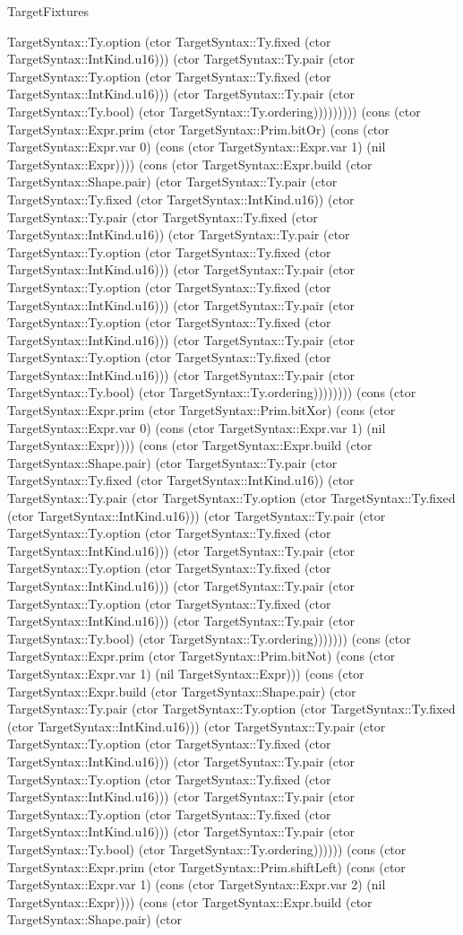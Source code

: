 \begin{lexlean}{TargetFixtures}
\begin{semanticmodule}
{TargetSyntax::Ty.option (ctor TargetSyntax::Ty.fixed (ctor TargetSyntax::IntKind.u16))) (ctor TargetSyntax::Ty.pair (ctor TargetSyntax::Ty.option (ctor TargetSyntax::Ty.fixed (ctor TargetSyntax::IntKind.u16))) (ctor TargetSyntax::Ty.pair (ctor TargetSyntax::Ty.bool) (ctor TargetSyntax::Ty.ordering))))))))) (cons (ctor TargetSyntax::Expr.prim (ctor TargetSyntax::Prim.bitOr) (cons (ctor TargetSyntax::Expr.var 0) (cons (ctor TargetSyntax::Expr.var 1) (nil TargetSyntax::Expr)))) (cons (ctor TargetSyntax::Expr.build (ctor TargetSyntax::Shape.pair) (ctor TargetSyntax::Ty.pair (ctor TargetSyntax::Ty.fixed (ctor TargetSyntax::IntKind.u16)) (ctor TargetSyntax::Ty.pair (ctor TargetSyntax::Ty.fixed (ctor TargetSyntax::IntKind.u16)) (ctor TargetSyntax::Ty.pair (ctor TargetSyntax::Ty.option (ctor TargetSyntax::Ty.fixed (ctor TargetSyntax::IntKind.u16))) (ctor TargetSyntax::Ty.pair (ctor TargetSyntax::Ty.option (ctor TargetSyntax::Ty.fixed (ctor TargetSyntax::IntKind.u16))) (ctor TargetSyntax::Ty.pair (ctor TargetSyntax::Ty.option (ctor TargetSyntax::Ty.fixed (ctor TargetSyntax::IntKind.u16))) (ctor TargetSyntax::Ty.pair (ctor TargetSyntax::Ty.option (ctor TargetSyntax::Ty.fixed (ctor TargetSyntax::IntKind.u16))) (ctor TargetSyntax::Ty.pair (ctor TargetSyntax::Ty.bool) (ctor TargetSyntax::Ty.ordering)))))))) (cons (ctor TargetSyntax::Expr.prim (ctor TargetSyntax::Prim.bitXor) (cons (ctor TargetSyntax::Expr.var 0) (cons (ctor TargetSyntax::Expr.var 1) (nil TargetSyntax::Expr)))) (cons (ctor TargetSyntax::Expr.build (ctor TargetSyntax::Shape.pair) (ctor TargetSyntax::Ty.pair (ctor TargetSyntax::Ty.fixed (ctor TargetSyntax::IntKind.u16)) (ctor TargetSyntax::Ty.pair (ctor TargetSyntax::Ty.option (ctor TargetSyntax::Ty.fixed (ctor TargetSyntax::IntKind.u16))) (ctor TargetSyntax::Ty.pair (ctor TargetSyntax::Ty.option (ctor TargetSyntax::Ty.fixed (ctor TargetSyntax::IntKind.u16))) (ctor TargetSyntax::Ty.pair (ctor TargetSyntax::Ty.option (ctor TargetSyntax::Ty.fixed (ctor TargetSyntax::IntKind.u16))) (ctor TargetSyntax::Ty.pair (ctor TargetSyntax::Ty.option (ctor TargetSyntax::Ty.fixed (ctor TargetSyntax::IntKind.u16))) (ctor TargetSyntax::Ty.pair (ctor TargetSyntax::Ty.bool) (ctor TargetSyntax::Ty.ordering))))))) (cons (ctor TargetSyntax::Expr.prim (ctor TargetSyntax::Prim.bitNot) (cons (ctor TargetSyntax::Expr.var 1) (nil TargetSyntax::Expr))) (cons (ctor TargetSyntax::Expr.build (ctor TargetSyntax::Shape.pair) (ctor TargetSyntax::Ty.pair (ctor TargetSyntax::Ty.option (ctor TargetSyntax::Ty.fixed (ctor TargetSyntax::IntKind.u16))) (ctor TargetSyntax::Ty.pair (ctor TargetSyntax::Ty.option (ctor TargetSyntax::Ty.fixed (ctor TargetSyntax::IntKind.u16))) (ctor TargetSyntax::Ty.pair (ctor TargetSyntax::Ty.option (ctor TargetSyntax::Ty.fixed (ctor TargetSyntax::IntKind.u16))) (ctor TargetSyntax::Ty.pair (ctor TargetSyntax::Ty.option (ctor TargetSyntax::Ty.fixed (ctor TargetSyntax::IntKind.u16))) (ctor TargetSyntax::Ty.pair (ctor TargetSyntax::Ty.bool) (ctor TargetSyntax::Ty.ordering)))))) (cons (ctor TargetSyntax::Expr.prim (ctor TargetSyntax::Prim.shiftLeft) (cons (ctor TargetSyntax::Expr.var 1) (cons (ctor TargetSyntax::Expr.var 2) (nil TargetSyntax::Expr)))) (cons (ctor TargetSyntax::Expr.build (ctor TargetSyntax::Shape.pair) (ctor }
\end{semanticmodule}
\end{lexlean}
